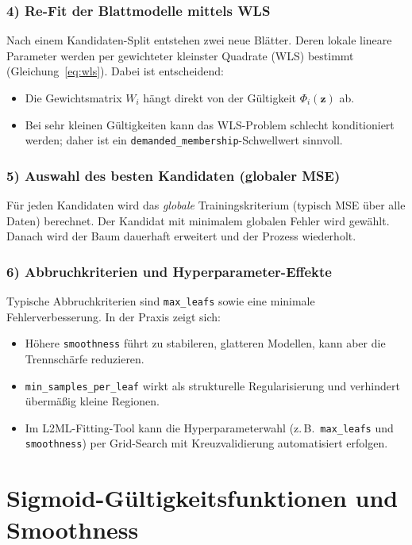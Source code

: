 \documentclass[11pt,a4paper]{report}
\begin{document}
\subsubsection{4) Re-Fit der Blattmodelle mittels WLS}
Nach einem Kandidaten-Split entstehen zwei neue Bl\"{a}tter. Deren lokale lineare Parameter
werden per gewichteter kleinster Quadrate (WLS) bestimmt
(Gleichung~\ref{eq:wls}). Dabei ist entscheidend:
\begin{itemize}
\item Die Gewichtsmatrix $W_i$ h\"{a}ngt direkt von der G\"{u}ltigkeit $\Phi_i(\mathbf{z})$ ab.
\item Bei sehr kleinen G\"{u}ltigkeiten kann das WLS-Problem schlecht konditioniert werden;
      daher ist ein \texttt{demanded\_membership}-Schwellwert sinnvoll.
\end{itemize}

\subsubsection{5) Auswahl des besten Kandidaten (globaler MSE)}
F\"{u}r jeden Kandidaten wird das \emph{globale} Trainingskriterium (typisch MSE \"{u}ber alle
Daten) berechnet. Der Kandidat mit minimalem globalen Fehler wird gew\"{a}hlt. Danach wird
der Baum dauerhaft erweitert und der Prozess wiederholt.

\subsubsection{6) Abbruchkriterien und Hyperparameter-Effekte}
Typische Abbruchkriterien sind \texttt{max\_leafs} sowie eine minimale Fehlerverbesserung.
In der Praxis zeigt sich:
\begin{itemize}
\item H\"{o}here \texttt{smoothness} f\"{u}hrt zu stabileren, glatteren Modellen, kann aber die
      Trennsch\"{a}rfe reduzieren.
\item \texttt{min\_samples\_per\_leaf} wirkt als strukturelle Regularisierung und verhindert
      \"{u}berm\"{a}\ss{}ig kleine Regionen.
\item Im L2ML-Fitting-Tool kann die Hyperparameterwahl (z.\,B.\ \texttt{max\_leafs} und
      \texttt{smoothness}) per Grid-Search mit Kreuzvalidierung automatisiert erfolgen.
\end{itemize}

\section{Sigmoid-G\"{u}ltigkeitsfunktionen und Smoothness}
\end{document}
